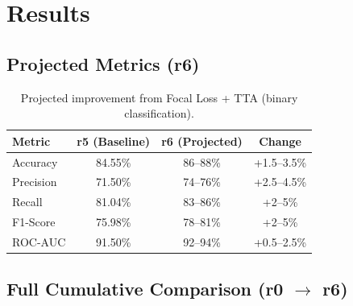 \documentclass[11pt]{article}
\begin{document}
\section{Results}

\subsection{Projected Metrics (r6)}

\begin{table}[H]
    \centering
    \renewcommand{\arraystretch}{1.2}
    \begin{tabular}{lccc}
        \toprule
        \textbf{Metric} & \textbf{r5 (Baseline)} & \textbf{r6 (Projected)} & \textbf{Change} \\
        \midrule
        Accuracy  & 84.55\% & 86--88\% & +1.5--3.5\% \\
        Precision & 71.50\% & 74--76\% & +2.5--4.5\% \\
        Recall    & 81.04\% & 83--86\% & +2--5\% \\
        F1-Score  & 75.98\% & 78--81\% & +2--5\% \\
        ROC-AUC   & 91.50\% & 92--94\% & +0.5--2.5\% \\
        \bottomrule
    \end{tabular}
    \caption{Projected improvement from Focal Loss + TTA (binary classification).}
\end{table}

\subsection{Full Cumulative Comparison (r0 $\to$ r6)}
\end{document}
